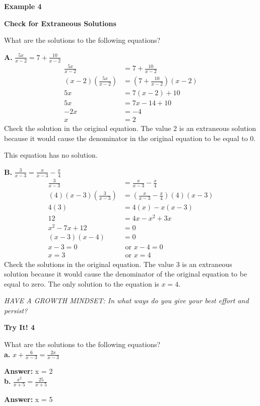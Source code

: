 \documentclass{article}
\newenvironment{example}[1]{\textbf{Example #1}\par}{\vspace{1em}}
\newenvironment{tryit}[1]{\textbf{Try It! #1}\par}{\vspace{1em}}
\newcommand{\answer}[1]{\par\textbf{Answer:} #1}
\begin{document}
\begin{example}{4}
\textbf{Check for Extraneous Solutions}

What are the solutions to the following equations?

\textbf{A.} $\frac{5x}{x-2} = 7 + \frac{10}{x-2}$
\begin{align*}
\frac{5x}{x-2} &= 7 + \frac{10}{x-2} \\
(x-2)\left(\frac{5x}{x-2}\right) &= \left(7 + \frac{10}{x-2}\right)(x-2) \\
5x &= 7(x-2) + 10 \\
5x &= 7x - 14 + 10 \\
-2x &= -4 \\
x &= 2
\end{align*}
Check the solution in the original equation. The value 2 is an extraneous solution because it would cause the denominator in the original equation to be equal to 0.

This equation has no solution.

\textbf{B.} $\frac{3}{x-3} = \frac{x}{x-3} - \frac{x}{4}$
\begin{align*}
\frac{3}{x-3} &= \frac{x}{x-3} - \frac{x}{4} \\
(4)(x-3)\left(\frac{3}{x-3}\right) &= \left(\frac{x}{x-3} - \frac{x}{4}\right)(4)(x-3) \\
4(3) &= 4(x) - x(x-3) \\
12 &= 4x - x^2 + 3x \\
x^2 - 7x + 12 &= 0 \\
(x-3)(x-4) &= 0 \\
x - 3 = 0 &\text{ or } x - 4 = 0 \\
x = 3 &\text{ or } x = 4
\end{align*}
Check the solutions in the original equation. The value 3 is an extraneous solution because it would cause the denominator of the original equation to be equal to zero. The only solution to the equation is $x = 4$.

\textit{HAVE A GROWTH MINDSET: In what ways do you give your best effort and persist?}
\end{example}

\begin{tryit}{4}
What are the solutions to the following equations? \\
\textbf{a.} $x + \frac{6}{x-3} = \frac{2x}{x-3}$ \answer{x = 2} \\
\textbf{b.} $\frac{x^2}{x+5} = \frac{25}{x+5}$ \answer{x = 5}
\end{tryit}
\end{document}
